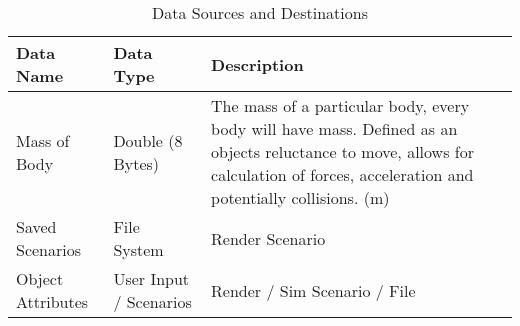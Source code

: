 \begin{table}[ht]
\caption{Data Sources and Destinations}
\centering
\footnotesize
\begin{tabular}{|M{3cm}|M{3cm}|m{8cm}|}
\hline 
\textbf{Data Name} & \textbf{Data Type} & \textbf{Description} \\
\hline
Mass of Body & Double (8 Bytes) & The mass of a particular body, every body will have mass. Defined as an objects reluctance to move, allows for calculation of forces, acceleration and potentially collisions. (m) \\
\hline
Saved Scenarios & File System & Render Scenario \\
\hline
Object Attributes & User Input / Scenarios & Render / Sim Scenario / File \\
\hline   
\end{tabular}
\end{table} 